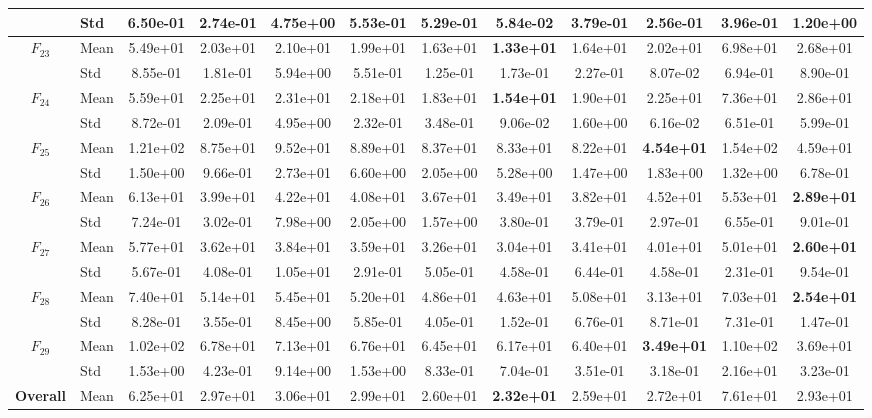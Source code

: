 \begin{center}
\begin{longtable}{clcccccccccc}
 & Std & 6.50e-01 & 2.74e-01 & 4.75e+00 & 5.53e-01 & 5.29e-01 & 5.84e-02 & 3.79e-01 & 2.56e-01 & 3.96e-01 & 1.20e+00 \\
\midrule
$F_{23}$ & Mean & 5.49e+01 & 2.03e+01 & 2.10e+01 & 1.99e+01 & 1.63e+01 & \textbf{1.33e+01} & 1.64e+01 & 2.02e+01 & 6.98e+01 & 2.68e+01 \\
 & Std & 8.55e-01 & 1.81e-01 & 5.94e+00 & 5.51e-01 & 1.25e-01 & 1.73e-01 & 2.27e-01 & 8.07e-02 & 6.94e-01 & 8.90e-01 \\
\midrule
$F_{24}$ & Mean & 5.59e+01 & 2.25e+01 & 2.31e+01 & 2.18e+01 & 1.83e+01 & \textbf{1.54e+01} & 1.90e+01 & 2.25e+01 & 7.36e+01 & 2.86e+01 \\
 & Std & 8.72e-01 & 2.09e-01 & 4.95e+00 & 2.32e-01 & 3.48e-01 & 9.06e-02 & 1.60e+00 & 6.16e-02 & 6.51e-01 & 5.99e-01 \\
\midrule
$F_{25}$ & Mean & 1.21e+02 & 8.75e+01 & 9.52e+01 & 8.89e+01 & 8.37e+01 & 8.33e+01 & 8.22e+01 & \textbf{4.54e+01} & 1.54e+02 & 4.59e+01 \\
 & Std & 1.50e+00 & 9.66e-01 & 2.73e+01 & 6.60e+00 & 2.05e+00 & 5.28e+00 & 1.47e+00 & 1.83e+00 & 1.32e+00 & 6.78e-01 \\
\midrule
$F_{26}$ & Mean & 6.13e+01 & 3.99e+01 & 4.22e+01 & 4.08e+01 & 3.67e+01 & 3.49e+01 & 3.82e+01 & 4.52e+01 & 5.53e+01 & \textbf{2.89e+01} \\
 & Std & 7.24e-01 & 3.02e-01 & 7.98e+00 & 2.05e+00 & 1.57e+00 & 3.80e-01 & 3.79e-01 & 2.97e-01 & 6.55e-01 & 9.01e-01 \\
\midrule
$F_{27}$ & Mean & 5.77e+01 & 3.62e+01 & 3.84e+01 & 3.59e+01 & 3.26e+01 & 3.04e+01 & 3.41e+01 & 4.01e+01 & 5.01e+01 & \textbf{2.60e+01} \\
 & Std & 5.67e-01 & 4.08e-01 & 1.05e+01 & 2.91e-01 & 5.05e-01 & 4.58e-01 & 6.44e-01 & 4.58e-01 & 2.31e-01 & 9.54e-01 \\
\midrule
$F_{28}$ & Mean & 7.40e+01 & 5.14e+01 & 5.45e+01 & 5.20e+01 & 4.86e+01 & 4.63e+01 & 5.08e+01 & 3.13e+01 & 7.03e+01 & \textbf{2.54e+01} \\
 & Std & 8.28e-01 & 3.55e-01 & 8.45e+00 & 5.85e-01 & 4.05e-01 & 1.52e-01 & 6.76e-01 & 8.71e-01 & 7.31e-01 & 1.47e-01 \\
\midrule
$F_{29}$ & Mean & 1.02e+02 & 6.78e+01 & 7.13e+01 & 6.76e+01 & 6.45e+01 & 6.17e+01 & 6.40e+01 & \textbf{3.49e+01} & 1.10e+02 & 3.69e+01 \\
 & Std & 1.53e+00 & 4.23e-01 & 9.14e+00 & 1.53e+00 & 8.33e-01 & 7.04e-01 & 3.51e-01 & 3.18e-01 & 2.16e+01 & 3.23e-01 \\
\midrule
\textbf{Overall} & Mean & 6.25e+01 & 2.97e+01 & 3.06e+01 & 2.99e+01 & 2.60e+01 & \textbf{2.32e+01} & 2.59e+01 & 2.72e+01 & 7.61e+01 & 2.93e+01 \\
\bottomrule
\end{longtable}
\end{center}
